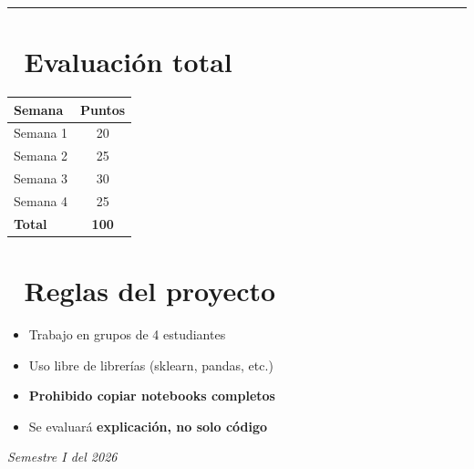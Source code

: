 \documentclass[11pt,a4paper]{article}
\begin{document}
\hrule
\vspace{1cm}

\section*{🧮 Evaluación total}

\begin{table}[H]
\centering
\begin{tabular}{lc}
\toprule
\textbf{Semana} & \textbf{Puntos} \\
\midrule
Semana 1 & 20 \\
Semana 2 & 25 \\
Semana 3 & 30 \\
Semana 4 & 25 \\
\midrule
\textbf{Total} & \textbf{100} \\
\bottomrule
\end{tabular}
\end{table}

\section*{🧩 Reglas del proyecto}

\begin{itemize}[leftmargin=1.5cm]
\item Trabajo en grupos de 4 estudiantes
\item Uso libre de librerías (sklearn, pandas, etc.)
\item \textbf{Prohibido copiar notebooks completos}
\item Se evaluará \textbf{explicación, no solo código}
\end{itemize}

\vfill

\begin{center}
\textit{Semestre I del 2026}
\end{center}
\end{document}
